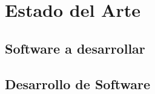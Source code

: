     \chapter{Estado del Arte}
    \section{Software a desarrollar}
    \section{Desarrollo de Software}
